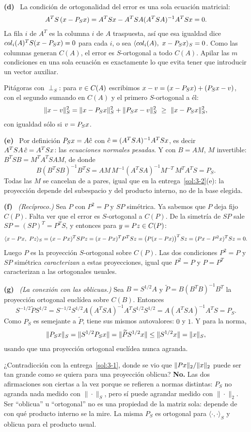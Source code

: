 \documentclass[11pt,a4paper]{article}
\newcommand{\bi}[1]{\boldsymbol{#1}}
\newcommand{\n}[1]{\boldsymbol{#1}}
\newcommand{\R}{\mathbb{R}}
\newcommand{\Cx}{\mathbb{C}}
\DeclareMathOperator{\gen}{span}
\DeclareMathOperator{\tr}{tr}
\DeclareMathOperator{\rg}{rg}
\DeclareMathOperator{\diag}{diag}
\DeclareMathOperator{\col}{col}
\DeclareMathOperator{\fila}{fila}
\def\n#1{#1}\def\bi#1{#1}\def\rg{rg}\def\tr{tr}\def\gen{span}%
\def\col{col}\def\fila{fila}\def\diag{diag}\def\R{R}\def\Cx{C}}
\newcounter{entrega}[section]
\newcommand{\itemsol}[1]{\par\medskip\noindent\textbf{(#1)}\ \ignorespaces}
\begin{document}
\itemsol{d} La condición de ortogonalidad del error es una sola ecuación
matricial:
\[
A^TS\,(\bx-P_S\bx)=A^TS\bx-A^TSA(A^TSA)^{-1}A^TS\bx=\n0 .
\]
La fila $i$ de $A^T$ es la columna $i$ de $A$ traspuesta, así que esa igualdad
dice $\col_i(A)^TS(\bx-P_S\bx)=0$ para cada $i$, o sea
$\langle\col_i(A),\ \bx-P_S\bx\rangle_S=0$. Como las columnas generan $C(A)$, el
error es $S$-ortogonal a todo $C(A)$. Apilar las $m$ condiciones en una sola
ecuación es exactamente lo que evita tener que introducir un vector auxiliar.

Pitágoras con $\perp_S$: para $\bv\in C(A)$ escribimos
$\bx-\bv=(\bx-P_S\bx)+(P_S\bx-\bv)$, con el segundo sumando en $C(A)$ y el
primero $S$-ortogonal a él:
\[
\|\bx-\bv\|_S^{2}=\|\bx-P_S\bx\|_S^{2}+\|P_S\bx-\bv\|_S^{2}
\ \ge\ \|\bx-P_S\bx\|_S^{2},
\]
con igualdad sólo si $\bv=P_S\bx$.

\itemsol{e} Por definición $P_S\bx=A\hat{\bi{c}}$ con
$\hat{\bi{c}}=(A^TSA)^{-1}A^TS\bx$, es decir
$A^TSA\,\hat{\bi{c}}=A^TS\bx$: las \emph{ecuaciones normales pesadas}. Y con
$B=AM$, $M$ invertible: $B^TSB=M^TA^TSAM$, de donde
\[
B(B^TSB)^{-1}B^TS=AM\,M^{-1}(A^TSA)^{-1}M^{-T}\,M^TA^TS=P_S .
\]
Todas las $M$ se cancelan de a pares, igual que en la entrega~\ref{sol:3-2}(e):
la proyección depende del subespacio y del producto interno, no de la base
elegida.

\itemsol{f} \emph{(Recíproco.)} Sea $P$ con $P^2=P$ y $SP$ simétrica. Ya sabemos
que $P$ deja fijo $C(P)$. Falta ver que el error es $S$-ortogonal a $C(P)$. De la
simetría de $SP$ sale $SP=(SP)^T=P^TS$, y entonces para
$\by=P\bz\in C(P)$:
\[
\langle \bx-P\bx,\ P\bz\rangle_S=(\bx-P\bx)^TSP\bz=(\bx-P\bx)^TP^{T}S\bz
=\big(P(\bx-P\bx)\big)^TS\bz=(P\bx-P^{2}\bx)^TS\bz=0 .
\]
Luego $P$ es la proyección $S$-ortogonal sobre $C(P)$. Las dos condiciones
$P^2=P$ y $SP$ simétrica \emph{caracterizan} a estas proyecciones, igual que
$P^2=P$ y $P=P^T$ caracterizan a las ortogonales usuales.

\itemsol{g} \emph{(La conexión con las oblicuas.)} Sea $B=S^{1/2}A$ y
$\widetilde P=B(B^TB)^{-1}B^T$ la proyección ortogonal euclídea sobre $C(B)$.
Entonces
\[
S^{-1/2}\widetilde PS^{1/2}
=S^{-1/2}S^{1/2}A(A^TSA)^{-1}A^TS^{1/2}S^{1/2}
=A(A^TSA)^{-1}A^TS=P_S .
\]
Como $P_S$ es semejante a $\widetilde P$, tiene sus mismos autovalores: $0$ y
$1$. Y para la norma,
\[
\|P_S\bx\|_S=\|S^{1/2}P_S\bx\|=\|\widetilde PS^{1/2}\bx\|
\le\|S^{1/2}\bx\|=\|\bx\|_S ,
\]
usando que una proyección ortogonal euclídea nunca agranda.

¿Contradicción con la entrega~\ref{sol:3-1}, donde se vio que
$\|P\bx\|_2/\|\bx\|_2$ puede ser tan grande como se quiera para una proyección
oblicua? \textbf{No.} Las dos afirmaciones son ciertas a la vez porque se
refieren a normas distintas: $P_S$ no agranda nada medido con $\|\cdot\|_S$, pero
sí puede agrandar medido con $\|\cdot\|_2$. Ser ``oblicua'' u ``ortogonal'' no es
una propiedad de la matriz sola: depende de con qué producto interno se la mire.
La misma $P_S$ es ortogonal para $\langle\cdot,\cdot\rangle_S$ y oblicua para el
producto usual.
\end{document}
